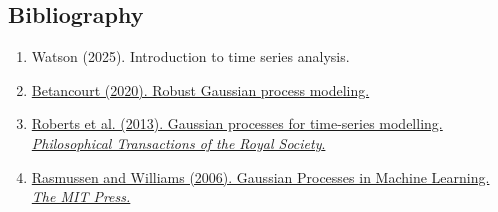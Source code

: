 \documentclass[a4paper, 10pt, fleqn]{article}
\begin{document}
\begin{flushleft}
   \section*{Bibliography}
      \begin{enumerate}
         \item \label{Watson2025} {Watson (2025). Introduction to time series analysis.}
         \item \label{Betancourt2020} \href{https://betanalpha.github.io/assets/case_studies/gaussian_processes.html}{Betancourt (2020). Robust Gaussian process modeling.}
          \item \label{Roberts2013} \href{https://royalsocietypublishing.org/}{Roberts et al. (2013). Gaussian processes for time-series modelling. \textit{Philosophical Transactions of the Royal Society}.}
         \item \label{Rasmussen2006} \href{https://gaussianprocess.org/gpml/}{Rasmussen and Williams (2006). Gaussian Processes in Machine Learning. \textit{The MIT Press.}}
      \end{enumerate}
   
   \end{flushleft}
\end{document}
